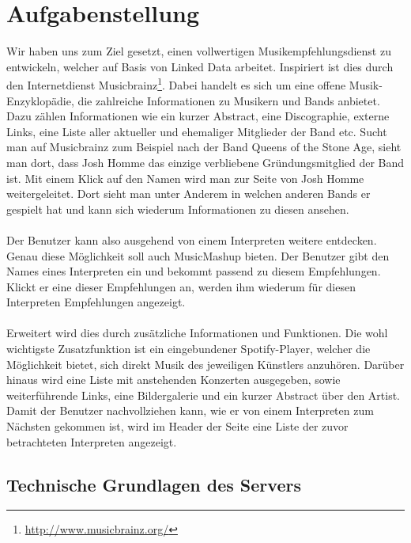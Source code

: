 \section{Aufgabenstellung}


Wir haben uns zum Ziel gesetzt, einen vollwertigen Musikempfehlungsdienst zu entwickeln, welcher auf Basis von Linked Data arbeitet. Inspiriert ist dies durch den Internetdienst Musicbrainz\footnote{\url{http://www.musicbrainz.org/}}. Dabei handelt es sich um eine offene Musik-Enzyklopädie, die zahlreiche Informationen zu Musikern und Bands anbietet. Dazu zählen Informationen wie ein kurzer Abstract, eine Discographie, externe Links, eine Liste aller aktueller und ehemaliger Mitglieder der Band etc. Sucht man auf Musicbrainz zum Beispiel nach der Band \glqq Queens of the Stone Age\grqq, sieht man dort, dass Josh Homme das einzige verbliebene Gründungsmitglied der Band ist. Mit einem Klick auf den Namen wird man zur Seite von Josh Homme weitergeleitet. Dort sieht man unter Anderem in welchen anderen Bands er gespielt hat und kann sich wiederum Informationen zu diesen ansehen.

\paragraph{} Der Benutzer kann also ausgehend von einem Interpreten weitere entdecken. Genau diese Möglichkeit soll auch MusicMashup bieten. Der Benutzer gibt den Names eines Interpreten ein und bekommt passend zu diesem Empfehlungen. Klickt er eine dieser Empfehlungen an, werden ihm wiederum für diesen Interpreten Empfehlungen angezeigt. 


\paragraph{} Erweitert wird dies durch zusätzliche Informationen und Funktionen. Die wohl wichtigste Zusatzfunktion ist ein eingebundener Spotify-Player, welcher die Möglichkeit bietet, sich direkt Musik des jeweiligen Künstlers anzuhören. Darüber hinaus wird eine Liste mit anstehenden Konzerten ausgegeben, sowie weiterführende Links, eine Bildergalerie und ein kurzer Abstract über den Artist. Damit der Benutzer nachvollziehen kann, wie er von einem Interpreten zum Nächsten gekommen ist, wird im Header der Seite eine Liste der zuvor betrachteten Interpreten angezeigt.

\subsection{Technische Grundlagen des Servers}

